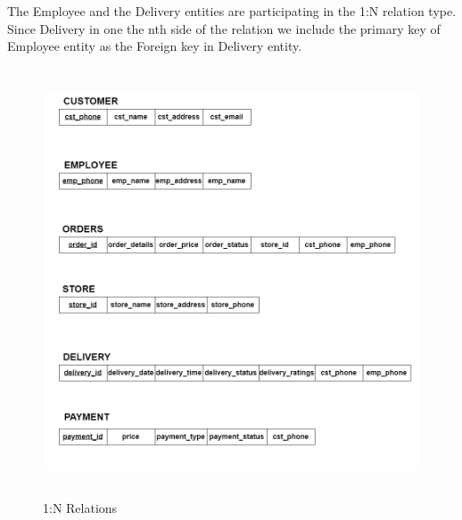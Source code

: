 \documentclass[12pt,a4paper]{report}
\begin{document}
The Employee and the Delivery entities are participating in the 1:N relation type. Since Delivery in one the nth side of the relation we include the primary key of Employee entity as the Foreign key in Delivery entity.\\
\begin{figure}[hbtp]
\centering
\includegraphics[width=6in,height=5in]{../fig/1toN (1)}
\caption{1:N Relations}
\end{figure} 
\newpage
\end{document}
